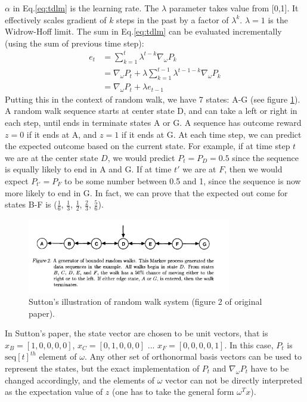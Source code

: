 \documentclass[conference]{IEEEtran}
\begin{document}
	$\alpha$ in Eq.\ref{eq:tdlm} is the learning rate. The $\lambda$ parameter takes value from [0,1]. It effectively scales gradient of $k$ steps in the past by a factor of $\lambda^k$. $\lambda=1$ is the Widrow-Hoff limit. The sum in Eq.\ref{eq:tdlm} can be evaluated incrementally (using the sum of previous time step):
	\begin{align*}
		e_t &= \sum_{k=1}^{t} \lambda^{t-k}\nabla_\omega P_k \\
		& = \nabla_\omega P_t + \lambda \sum_{k=1}^{t-1} \lambda^{t-1-k}\nabla_\omega P_k \\
		& = \nabla_\omega P_t + \lambda e_{t-1}
	\end{align*}
	Putting this in the context of random walk, we have 7 states: A-G (see figure \ref{fig:1}). A random walk sequence starts at center state D, and can take a left or right in each step, until ends in terminate states A or G. A sequence has outcome reward $z=0$ if it ends at A, and $z=1$ if it ends at G. At each time step, we can predict the expected outcome based on the current state. For example, if at time step $t$ we are at the center state $D$, we would predict $P_t = P_D = 0.5$ since the sequence is equally likely to end in A and G. If at time $t'$ we are at $F$, then we would expect $P_{t'}=P_F$ to be some number between 0.5 and 1, since the sequence is now more likely to end in G. In fact, we can prove that the expected out come for states B-F is ($\frac{1}{6}$, $\frac{1}{3}$, $\frac{1}{2}$, $\frac{2}{3}$, $\frac{5}{6}$).
	
		\begin{figure}
			\includegraphics[width=3.5in]{figure2.png} 
			\caption{Sutton's illustration of random walk system (figure 2 of original paper).}
			\label{fig:1}
		\end{figure}
	
	In Sutton's paper, the state vector are chosen to be unit vectors, that is $x_B = [1,0,0,0,0]$, $x_C = [0,1,0,0,0]$ ... $x_F = [0,0,0,0,1]$. In this case, $P_t$ is $\mathrm{seq}[t]^{th}$ element of $\omega$. Any other set of orthonormal basis vectors can be used to represent the states, but the exact implementation of $P_t$ and $\nabla_\omega P_t$ have to be changed accordingly, and the elements of $\omega$ vector can not be directly interpreted as the expectation value of $z$ (one has to take the general form $\omega^T x$).
	
\end{document}
